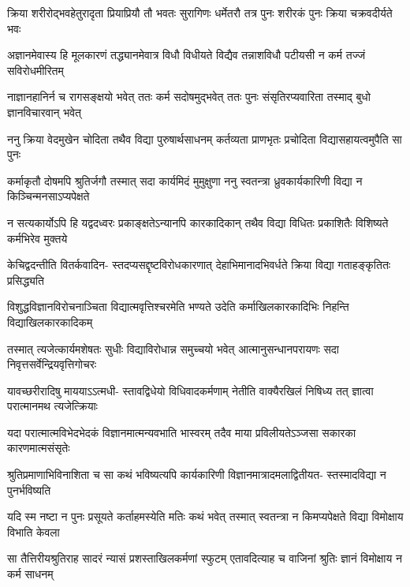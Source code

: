 \fourlineindentedshloka
{क्रिया शरीरोद्भवहेतुरादृता}
{प्रियाप्रियौ तौ भवतः सुरागिणः}
{धर्मेतरौ तत्र पुनः शरीरकं}
{पुनः क्रिया चक्रवदीर्यते भवः} %

\fourlineindentedshloka
{अज्ञानमेवास्य हि मूलकारणं}
{तद्ध्यानमेवात्र विधौ विधीयते}
{विद्यैव तन्नाशविधौ पटीयसी}
{न कर्म तज्जं सविरोधमीरितम्} %

\fourlineindentedshloka
{नाज्ञानहानिर्न च रागसङ्क्षयो}
{भवेत् ततः कर्म सदोषमुद्भवेत्}
{ततः पुनः संसृतिरप्यवारिता}
{तस्माद् बुधो ज्ञानविचारवान् भवेत्} %

\fourlineindentedshloka
{ननु क्रिया वेदमुखेन चोदिता}
{तथैव विद्या पुरुषार्थसाधनम्}
{कर्तव्यता प्राणभृतः प्रचोदिता}
{विद्यासहायत्वमुपैति सा पुनः} %

\fourlineindentedshloka
{कर्माकृतौ दोषमपि श्रुतिर्जगौ}
{तस्मात् सदा कार्यमिदं मुमुक्षुणा}
{ननु स्वतन्त्रा ध्रुवकार्यकारिणी}
{विद्या न किञ्चिन्मनसाऽप्यपेक्षते} %

\fourlineindentedshloka
{न सत्यकार्योऽपि हि यद्वदध्वरः}
{प्रकाङ्क्षतेऽन्यानपि कारकादिकान्}
{तथैव विद्या विधितः प्रकाशितैः}
{विशिष्यते कर्मभिरेव मुक्तये} %

\fourlineindentedshloka
{केचिद्वदन्तीति वितर्कवादिन-}
{स्तदप्यसद्दृष्टविरोधकारणात्}
{देहाभिमानादभिवर्धते क्रिया}
{विद्या गताहङ्कृतितः प्रसिद्ध्यति} %

\fourlineindentedshloka
{विशुद्धविज्ञानविरोचनाञ्चिता}
{विद्यात्मवृत्तिश्चरमेति भण्यते}
{उदेति कर्माखिलकारकादिभिः}
{निहन्ति विद्याखिलकारकादिकम्} %

\fourlineindentedshloka
{तस्मात् त्यजेत्कार्यमशेषतः सुधीः}
{विद्याविरोधान्न समुच्चयो भवेत्}
{आत्मानुसन्धानपरायणः सदा}
{निवृत्तसर्वेन्द्रियवृत्तिगोचरः} %

\fourlineindentedshloka
{यावच्छरीरादिषु माययाऽऽत्मधी-}
{स्तावद्विधेयो विधिवादकर्मणाम्}
{नेतीति वाक्यैरखिलं निषिध्य तत्}
{ज्ञात्वा परात्मानमथ त्यजेत्क्रियाः} %

\fourlineindentedshloka
{यदा परात्मात्मविभेदभेदकं}
{विज्ञानमात्मन्यवभाति भास्वरम्}
{तदैव माया प्रविलीयतेऽञ्जसा}
{सकारका कारणमात्मसंसृतेः} %

\fourlineindentedshloka
{श्रुतिप्रमाणाभिविनाशिता च सा}
{कथं भविष्यत्यपि कार्यकारिणी}
{विज्ञानमात्रादमलाद्वितीयत-}
{स्तस्मादविद्या न पुनर्भविष्यति} %

\fourlineindentedshloka
{यदि स्म नष्टा न पुनः प्रसूयते}
{कर्ताहमस्येति मतिः कथं भवेत्}
{तस्मात् स्वतन्त्रा न किमप्यपेक्षते}
{विद्या विमोक्षाय विभाति केवला} %

\fourlineindentedshloka
{सा तैत्तिरीयश्रुतिराह सादरं}
{न्यासं प्रशस्ताखिलकर्मणां स्फुटम्}
{एतावदित्याह च वाजिनां श्रुतिः}
{ज्ञानं विमोक्षाय न कर्म साधनम्} %

